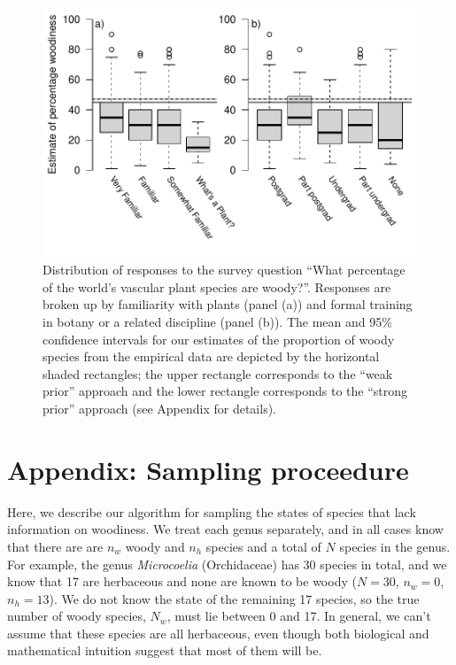 \documentclass[12pt]{article}
\begin{document}
\begin{figure}[p]
  \centering
  \includegraphics{figs/survey-results}
  \caption{
    Distribution of responses to the survey question ``What percentage
    of the world's vascular plant species are woody?''. Responses are
    broken up by familiarity with plants (panel (a)) and formal
    training in botany or a related discipline (panel (b)). The mean
    and 95\% confidence intervals for our estimates of the proportion
    of woody species from the empirical data are depicted by the horizontal
    shaded rectangles; the upper rectangle corresponds to the ``weak
    prior'' approach and the lower rectangle corresponds to the ``strong
    prior'' approach (see Appendix for details).}
  \label{fig:survey}
\end{figure}

\clearpage
\renewcommand\thefigure{S.\arabic{figure}}
\appendix
\section{Appendix: Sampling proceedure}
\setcounter{figure}{0}    

Here, we describe our algorithm for sampling the states of species
that lack information on woodiness. We treat each genus separately,
and in all cases know that there are are $n_w$ woody and $n_h$ species
and a total of $N$ species in the genus.
%
For example, the genus \textit{Microcoelia} (Orchidaceae) has 30
species in total, and we know that 17 are herbaceous and none are
known to be woody ($N = 30$, $n_w = 0$, $n_h = 13$). We do not know
the state of the remaining 17 species, so the true number of woody
species, $N_w$, must lie between 0 and 17. In general, we can't
assume that these species are all herbaceous, even though both
biological and mathematical intuition suggest that most of them will
be.
\end{document}
